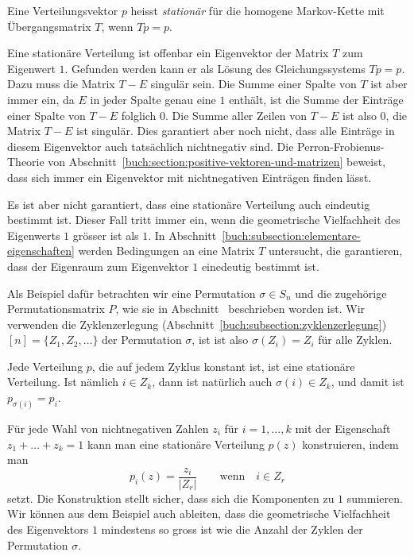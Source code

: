 \begin{definition}
Eine Verteilungsvektor $p$ heisst {\em stationär} für die
homogene Markov-Kette mit Übergangsmatrix $T$, wenn $Tp=p$.
%
\end{definition}

Eine stationäre Verteilung ist offenbar ein Eigenvektor der Matrix
$T$  zum Eigenwert $1$.
Gefunden werden kann er als Lösung des Gleichungssystems $Tp=p$.
Dazu muss die Matrix $T-E$ singulär sein.
Die Summe einer Spalte von $T$ ist aber immer ein, da $E$ in jeder Spalte
genau eine $1$ enthält, ist die Summe der Einträge einer Spalte von
$T-E$ folglich $0$.
Die Summe aller Zeilen von $T-E$ ist also $0$, die Matrix $T-E$ 
ist singulär.
Dies garantiert aber noch nicht, dass alle Einträge in diesem
Eigenvektor auch tatsächlich nichtnegativ sind.
Die Perron-Frobienus-Theorie von
Abschnitt~\ref{buch:section:positive-vektoren-und-matrizen}
beweist, dass sich immer ein Eigenvektor mit nichtnegativen
Einträgen finden lässt.

Es ist aber nicht garantiert, dass eine stationäre Verteilung
auch eindeutig bestimmt ist.
Dieser Fall tritt immer ein, wenn die geometrische Vielfachheit
des Eigenwerts $1$ grösser ist als $1$.
In Abschnitt~\ref{buch:subsection:elementare-eigenschaften}
werden Bedingungen an eine Matrix $T$ untersucht, die garantieren,
dass der Eigenraum zum Eigenvektor $1$ einedeutig bestimmt ist.

\begin{beispiel}
Als Beispiel dafür betrachten wir eine Permutation $\sigma\in S_n$
und die zugehörige Permutationsmatrix $P$,
wie sie in Abschnitt~\label{buch:section:permutationsmatrizen}
beschrieben worden ist.
Wir verwenden die 
Zyklenzerlegung (Abschnitt~\ref{buch:subsection:zyklenzerlegung})
\(
[n] = \{ Z_1, Z_2,\dots \}
\)
der Permutation $\sigma$, ist ist also $\sigma(Z_i) = Z_i$ für alle
Zyklen.

Jede Verteilung $p$, die auf jedem Zyklus konstant ist, ist eine
stationäre Verteilung.
Ist nämlich $i\in Z_k$, dann ist natürlich auch $\sigma(i)\in Z_k$,
und damit ist $p_{\sigma(i)}=p_i$.

Für jede Wahl von nichtnegativen Zahlen $z_i$ für $i=1,\dots,k$
mit der Eigenschaft $z_1+\dots+z_k=1$ kann man eine stationäre
Verteilung $p(z)$ konstruieren, indem man
\[
p_i(z)
=
\frac{z_i}{|Z_r|}
\qquad\text{wenn}\quad i\in Z_r
\]
setzt.
Die Konstruktion stellt sicher, dass sich die Komponenten zu $1$
summieren.
Wir können aus dem Beispiel auch ableiten, dass die geometrische
Vielfachheit des Eigenvektors $1$ mindestens so gross ist wie die
Anzahl der Zyklen der Permutation $\sigma$.
\end{beispiel}

